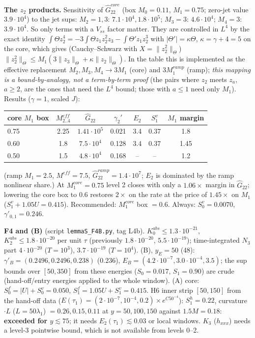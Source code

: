 \documentclass[11pt]{article}
\begin{document}
\textbf{The $z_2$ products.} Sensitivity of $\hat G_{22}^{core}$ (box $M_0=0.11$, $M_1=0.75$; zero-jet value $3.9\cdot10^4$) to the jet sups: $M_2=1,3$: $7.1\cdot10^4,1.8\cdot10^5$; $M_3=3$: $4.6\cdot10^4$; $M_4=3$: $3.9\cdot10^4$. So only terms with a $V_{ss}$ factor matter. They are controlled in $L^4$ by the exact identity $\int\Theta z_2^4=-3\int\Theta z_1z_2^2z_3-\int\Theta'z_1z_2^3$ with $|\Theta'|=\kappa\Theta$, $\kappa=\gamma+4=5$ on the core, which gives (Cauchy--Schwarz with $X=\|z_2^2\|_\Theta$) $\|z_2^2\|_\Theta\le M_1(3\|z_3\|_\Theta+\kappa\|z_2\|_\Theta)$. In the table this is implemented as the effective replacement $M_2,M_3,M_4\to3M_1$ (core) and $3M_1^{ramp}$ (ramp); \emph{this mapping is a bound-by-analogy, not a term-by-term proof} (the pairs where $z_2$ meets $z_a$, $a\ge2$, are the ones that need the $L^4$ bound; those with $a\le1$ need only $M_1$). Results ($\gamma=1$, scaled $J$): 
\begin{center}\begin{tabular}{lcccccc}
core $M_1$ box & $M_{2..4}^{eff}$ & $\hat G_{22}$ & $\gamma_2'$ & $E_2$ & $S_1^v$ & $M_1$ margin\\\hline
0.75 & 2.25 & $1.41\cdot10^5$ & 0.021 & 3.4 & 0.37 & 1.8\\
0.60 & 1.8 & $7.5\cdot10^4$ & 0.128 & 3.4 & 0.37 & 1.45\\
0.50 & 1.5 & $4.8\cdot10^4$ & 0.168 & -- & -- & 1.2\\
\end{tabular}\end{center}
(ramp $M_1=2.5$, $M^{eff}=7.5$, $\hat G^{ramp}_{22}=1.4\cdot10^7$; $E_2$ is dominated by the ramp nonlinear share.) At $M_1^{core}=0.75$ level 2 closes with only a $1.06\times$ margin in $\hat G_{22}$; lowering the core box to $0.6$ restores $2\times$ on the rate at the price of $1.45\times$ on $M_1$ ($S_1^v+1.05U=0.415$). Recommended: $M_1^{core}$ box $=0.6$. Always: $S_0^v=0.0070$, $\gamma'_{0,1}=0.246$.

\textbf{F4 and (B)} (script \texttt{lemmaS\_F4B.py}, tag L4b). $K_0^{abs}\le1.3\cdot10^{-21}$, $K_2^{abs}\le1.8\cdot10^{-20}$ per unit $\tau$ (previously $1.8\cdot10^{-20}$, $5.5\cdot10^{-19}$); time-integrated $N_3$ part $4\cdot10^{-20}$ ($T=10^3$), $3.7\cdot10^{-19}$ ($T=10^4$). (B), $y_E=50$ (48): $\gamma'_B=(0.2496,0.2496,0.238)$ ($0.236$), $E_B=(4.2\cdot10^{-7},3.0\cdot10^{-4},3.5)$; the sup bounds over $[50,350]$ from these energies ($S_0=0.017$, $S_1=0.90$) are crude (hand-off/entry energies applied to the whole window). (A) core: $S_0^f=|U|+S_0^v=0.050$, $S_1^f=1.05U+S_1^v=0.415$. H6 inner strip $[50,150]$ from the hand-off data ($E(\tau_1)=(2\cdot10^{-7},10^{-4},0.2)\times e^{C50^{-4}}$): $S_1^h=0.22$, curvature$\cdot L$ ($L=50\lambda_1$) $=0.26,0.15,0.11$ at $y=50,100,150$ against $1.5M=0.18$: \textbf{exceeded for $y\lesssim75$}; it needs $E_2(\tau_1)\lesssim0.03$ or local windows. $K_3$ ($h_{xxx}$) needs a level-3 pointwise bound, which is not available from levels 0--2.
\end{document}
